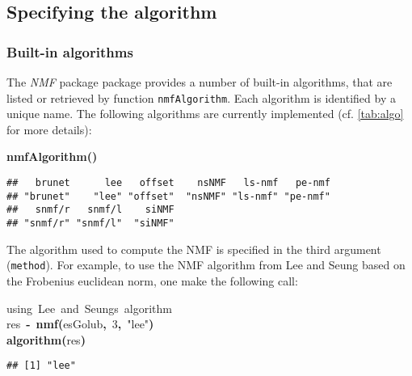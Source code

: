 \documentclass[a4paper]{article}\usepackage{graphicx, color}
\makeatletter
\newcommand{\hlnumber}[1]{\textcolor[rgb]{0,0,0}{#1}}%
\newcommand{\hlfunctioncall}[1]{\textcolor[rgb]{0.501960784313725,0,0.329411764705882}{\textbf{#1}}}%
\newcommand{\hlstring}[1]{\textcolor[rgb]{0.6,0.6,1}{#1}}%
\newcommand{\hlkeyword}[1]{\textcolor[rgb]{0,0,0}{\textbf{#1}}}%
\newcommand{\hlcomment}[1]{\textcolor[rgb]{0.180392156862745,0.6,0.341176470588235}{#1}}%
\newcommand{\hlassignement}[1]{\textcolor[rgb]{0,0,0}{\textbf{#1}}}%
\newcommand{\hlsymbol}[1]{\textcolor[rgb]{0,0,0}{#1}}%
\newcommand{\hlstd}[1]{\textcolor[rgb]{0,0,0}{#1}}%
\newenvironment{kframe}{%
 \def\FrameCommand##1{\hskip\@totalleftmargin \hskip-\fboxsep
 \colorbox{shadecolor}{##1}\hskip-\fboxsep
     \hskip-\linewidth \hskip-\@totalleftmargin \hskip\columnwidth}%
 \MakeFramed {\advance\hsize-\width
   \@totalleftmargin\z@ \linewidth\hsize
   \@setminipage}}%
 {\par\unskip\endMakeFramed}
\newenvironment{knitrout}{}{} %
\let\code=\texttt
\newcommand{\pkgname}[1]{\textit{#1}\xspace}
\newcommand{\Rpkg}[1]{\pkgname{#1} package\xspace}
\newcommand{\nmfpack}{\Rpkg{NMF}}
\makeatother
\begin{document}
\subsection{Specifying the algorithm}\label{sec:algo}

\subsubsection{Built-in algorithms}
The \nmfpack package provides a number of built-in algorithms, that are listed or retrieved by function \code{nmfAlgorithm}. 
Each algorithm is identified by a unique name.
The following algorithms are currently implemented (cf. \cref{tab:algo} for more details):

\begin{knitrout}
\color{fgcolor}\begin{kframe}
\begin{flushleft}
\ttfamily\noindent
\hlfunctioncall{nmfAlgorithm}\hlkeyword{(}\hlkeyword{)}\mbox{}
\normalfont
\end{flushleft}
\begin{verbatim}
##   brunet      lee   offset    nsNMF   ls-nmf   pe-nmf 
## "brunet"    "lee" "offset"  "nsNMF" "ls-nmf" "pe-nmf" 
##   snmf/r   snmf/l    siNMF 
## "snmf/r" "snmf/l"  "siNMF" 
\end{verbatim}
\end{kframe}
\end{knitrout}



The algorithm used to compute the NMF is specified in the third argument (\code{method}). 
For example, to use the NMF algorithm from Lee and Seung \cite{Lee2001} based on
the Frobenius euclidean norm, one make the following call:
\begin{knitrout}
\color{fgcolor}\begin{kframe}
\begin{flushleft}
\ttfamily\noindent
\hlcomment{\usebox{\hlnormalsizeboxhash}{\ }using{\ }Lee{\ }and{\ }Seung\usebox{\hlnormalsizeboxsinglequote}s{\ }algorithm}\hspace*{\fill}\\
\hlstd{}\hlsymbol{res}{\ }\hlassignement{\usebox{\hlnormalsizeboxlessthan}-}{\ }\hlfunctioncall{nmf}\hlkeyword{(}\hlsymbol{esGolub}\hlkeyword{,}{\ }\hlnumber{3}\hlkeyword{,}{\ }\hlstring{"{}lee"{}}\hlkeyword{)}\hspace*{\fill}\\
\hlstd{}\hlfunctioncall{algorithm}\hlkeyword{(}\hlsymbol{res}\hlkeyword{)}\mbox{}
\normalfont
\end{flushleft}
\begin{verbatim}
## [1] "lee"
\end{verbatim}
\end{kframe}
\end{knitrout}
\end{document}
